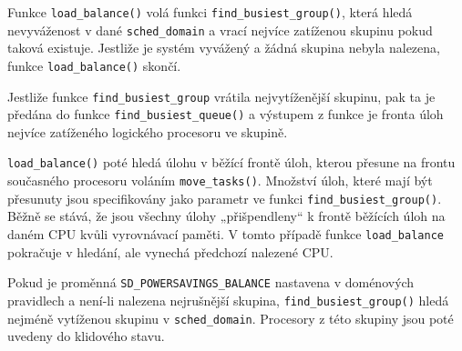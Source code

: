 \documentclass[
  master=true,
  font=sans,
  printversion=false,
  joinlists=true,
  figures=true,
  tables=true,
  sourcecodes=false,
  theorems=false,
  bibencoding=utf8,
  language=czech,
  encoding=utf8,
  field=ainfk,
  biblatex,
  glossaries,
  index
]{kidiplom}
\begin{document}
Funkce \verb#load_balance()# volá funkci \verb#find_busiest_group()#, která hledá nevyváženost v dané \verb#sched_domain# a vrací nejvíce zatíženou skupinu pokud taková existuje. Jestliže je systém vyvážený a žádná skupina nebyla nalezena, funkce \verb#load_balance()# skončí.

Jestliže funkce \verb#find_busiest_group# vrátila nejvytíženější skupinu, pak ta je předána do funkce \verb#find_busiest_queue()# a výstupem z funkce je fronta úloh nejvíce zatíženého logického procesoru ve skupině.

\verb#load_balance()# poté hledá úlohu v běžící frontě úloh, kterou přesune na frontu současného procesoru voláním \verb#move_tasks()#. Množství úloh, které mají být přesunuty jsou specifikovány jako parametr ve funkci \newline \verb#find_busiest_group()#. Běžně se stává, že jsou všechny úlohy „přišpendleny“ k frontě běžících úloh na daném CPU kvůli vyrovnávací paměti. V tomto případě funkce \verb#load_balance# pokračuje v hledání, ale vynechá předchozí nalezené CPU.

Pokud je proměnná \verb#SD_POWERSAVINGS_BALANCE# nastavena v doménových pravidlech a není-li nalezena nejrušnější skupina, \verb#find_busiest_group()# hledá nejméně vytíženou skupinu v \verb#sched_domain#. Procesory z této skupiny jsou poté uvedeny do klidového stavu. 
\end{document}
